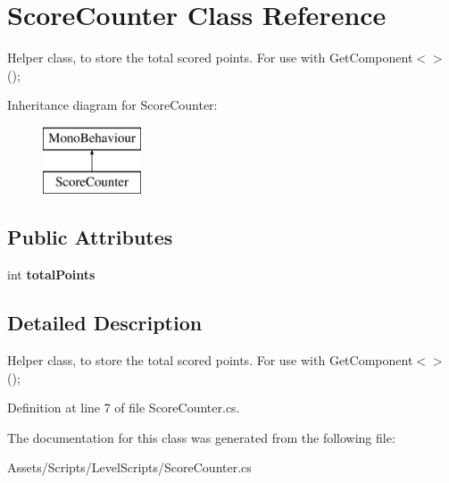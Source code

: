\hypertarget{class_score_counter}{\section{Score\+Counter Class Reference}
\label{class_score_counter}
}


Helper class, to store the total scored points. For use with Get\+Component$<$$>$();  


Inheritance diagram for Score\+Counter\+:\begin{figure}[H]
\begin{center}
\leavevmode
\includegraphics[height=2.000000cm]{class_score_counter}
\end{center}
\end{figure}
\subsection*{Public Attributes}
\begin{DoxyCompactItemize}
\item 
\hypertarget{class_score_counter_a4dfb92a30d6b9f84514a10ebcf138692}{int {\bfseries total\+Points}}\label{class_score_counter_a4dfb92a30d6b9f84514a10ebcf138692}

\end{DoxyCompactItemize}


\subsection{Detailed Description}
Helper class, to store the total scored points. For use with Get\+Component$<$$>$(); 



Definition at line 7 of file Score\+Counter.\+cs.



The documentation for this class was generated from the following file\+:\begin{DoxyCompactItemize}
\item 
Assets/\+Scripts/\+Level\+Scripts/Score\+Counter.\+cs\end{DoxyCompactItemize}
